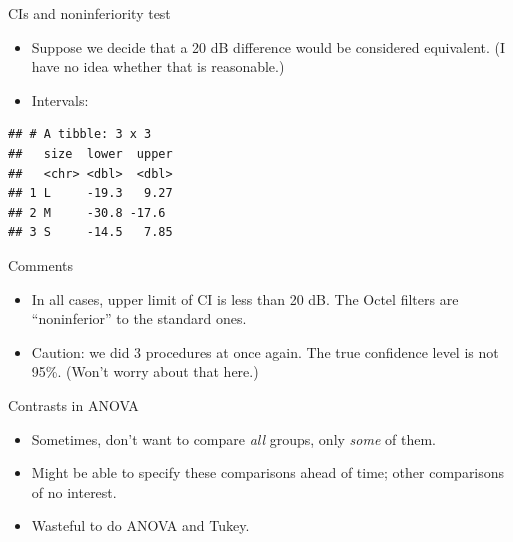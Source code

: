 \documentclass[ignorenonframetext,]{beamer}
\newenvironment{Shaded}{\begin{snugshade}}{\end{snugshade}}
\newcommand{\DataTypeTok}[1]{\textcolor[rgb]{0.13,0.29,0.53}{#1}}
\newcommand{\DecValTok}[1]{\textcolor[rgb]{0.00,0.00,0.81}{#1}}
\newcommand{\KeywordTok}[1]{\textcolor[rgb]{0.13,0.29,0.53}{\textbf{#1}}}
\newcommand{\NormalTok}[1]{#1}
\newcommand{\OperatorTok}[1]{\textcolor[rgb]{0.81,0.36,0.00}{\textbf{#1}}}
\newcommand{\StringTok}[1]{\textcolor[rgb]{0.31,0.60,0.02}{#1}}
\begin{document}
\begin{frame}[fragile]{CIs and noninferiority test}
\protect\hypertarget{cis-and-noninferiority-test}{}

\begin{itemize}
\item
  Suppose we decide that a 20 dB difference would be considered
  equivalent. (I have no idea whether that is reasonable.)
\item
  Intervals: \vspace{2ex}
\end{itemize}

\small

\begin{Shaded}
\end{Shaded}

\begin{verbatim}
## # A tibble: 3 x 3
##   size  lower  upper
##   <chr> <dbl>  <dbl>
## 1 L     -19.3   9.27
## 2 M     -30.8 -17.6 
## 3 S     -14.5   7.85
\end{verbatim}

\normalsize

\end{frame}

\begin{frame}{Comments}
\protect\hypertarget{comments-16}{}

\begin{itemize}
\item
  In all cases, upper limit of CI is less than 20 dB. The Octel filters
  are ``noninferior'' to the standard ones.
\item
  Caution: we did 3 procedures at once again. The true confidence level
  is not 95\%. (Won't worry about that here.)
\end{itemize}

\end{frame}

\begin{frame}{Contrasts in ANOVA}
\protect\hypertarget{contrasts-in-anova}{}

\begin{itemize}
\item
  Sometimes, don't want to compare \emph{all} groups, only \emph{some}
  of them.
\item
  Might be able to specify these comparisons ahead of time; other
  comparisons of no interest.
\item
  Wasteful to do ANOVA and Tukey.
\end{itemize}

\end{frame}
\end{document}

